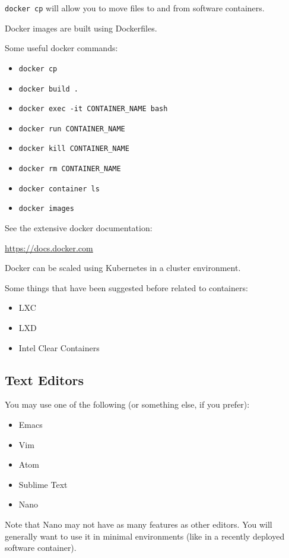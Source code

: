 \documentclass{article}
\begin{document}
\texttt{docker cp} will allow you to move files
to and from software containers.

Docker images are built using Dockerfiles.

Some useful docker commands:

\begin{itemize}
\item \texttt{docker cp}
\item \texttt{docker build .}
\item \texttt{docker exec -it CONTAINER\_NAME bash}
\item \texttt{docker run CONTAINER\_NAME}
\item \texttt{docker kill CONTAINER\_NAME}
\item \texttt{docker rm CONTAINER\_NAME}
\item \texttt{docker container ls}
\item \texttt{docker images}
\end{itemize}

See the extensive docker documentation:

\url{https://docs.docker.com}

Docker can be scaled using Kubernetes in a cluster environment.

Some things that have been suggested before related to containers:

\begin{itemize}
\item LXC
\item LXD
\item Intel Clear Containers
\end{itemize}

\subsection{Text Editors}
 
You may use one of the following (or something else, if you prefer):

\begin{itemize}
\item Emacs
\item Vim
\item Atom
\item Sublime Text
\item Nano
\end{itemize}

Note that Nano may not have as many features as other editors.
You will generally want to use it in minimal environments 
(like in a recently deployed software container).
\end{document}
